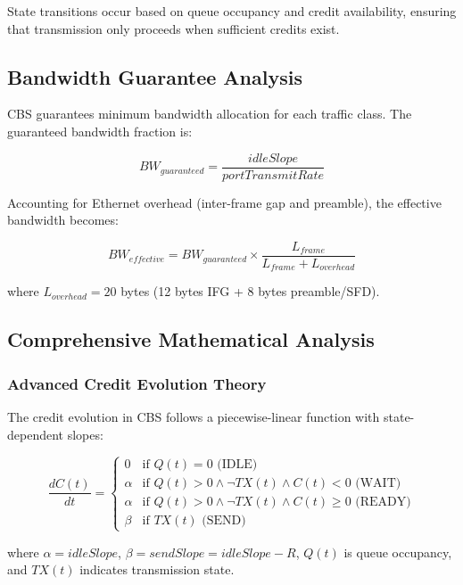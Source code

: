 \documentclass[10pt, journal, compsoc]{IEEEtran}
\begin{document}
State transitions occur based on queue occupancy and credit availability, ensuring that transmission only proceeds when sufficient credits exist.

\subsection{Bandwidth Guarantee Analysis}

CBS guarantees minimum bandwidth allocation for each traffic class. The guaranteed bandwidth fraction is:

\begin{equation}
BW_{guaranteed} = \frac{idleSlope}{portTransmitRate}
\end{equation}

Accounting for Ethernet overhead (inter-frame gap and preamble), the effective bandwidth becomes:

\begin{equation}
BW_{effective} = BW_{guaranteed} \times \frac{L_{frame}}{L_{frame} + L_{overhead}}
\end{equation}

where $L_{overhead} = 20$ bytes (12 bytes IFG + 8 bytes preamble/SFD).

\subsection{Comprehensive Mathematical Analysis}

\subsubsection{Advanced Credit Evolution Theory}

The credit evolution in CBS follows a piecewise-linear function with state-dependent slopes:

\begin{equation}
\frac{dC(t)}{dt} = \begin{cases}
0 & \text{if } Q(t) = 0 \text{ (IDLE)} \\
\alpha & \text{if } Q(t) > 0 \wedge \neg TX(t) \wedge C(t) < 0 \text{ (WAIT)} \\
\alpha & \text{if } Q(t) > 0 \wedge \neg TX(t) \wedge C(t) \geq 0 \text{ (READY)} \\
\beta & \text{if } TX(t) \text{ (SEND)}
\end{cases}
\end{equation}

where $\alpha = idleSlope$, $\beta = sendSlope = idleSlope - R$, $Q(t)$ is queue occupancy, and $TX(t)$ indicates transmission state.
\end{document}
